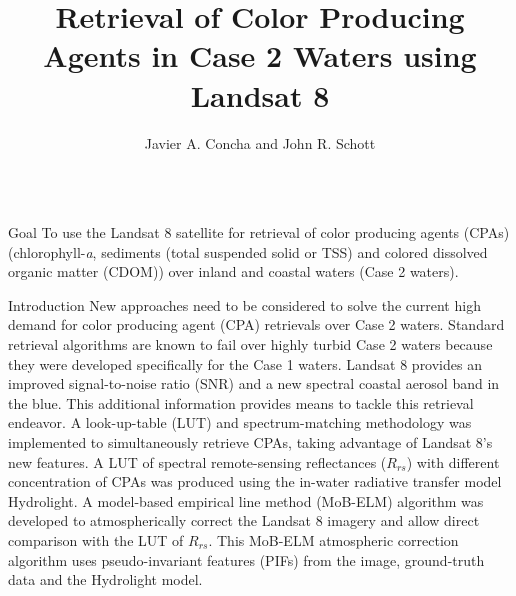 \documentclass{beamer}
\title{ \huge Retrieval of Color Producing Agents in Case 2 Waters using Landsat 8}
\author[]{Javier A. Concha and John R. Schott}
\institute[Rochester Institute of Technology]{Digital Imaging and Remote Sensing Laboratory, Chester F. Carlson Center for Imaging Science\\ Rochester Institute of Technology, Rochester, New York, USA}
\begin{document}
\begin{frame}{} 
  \begin{columns}[t]
    

\begin{column}{.3\linewidth}
\begin{block}{Goal}
\justifying\small 
To use the Landsat 8 satellite for retrieval of color producing agents (CPAs) (chlorophyll-{\it a}, sediments (total suspended solid or TSS) and colored dissolved organic matter (CDOM)) over inland and coastal waters (Case 2 waters). 
\end{block}
\begin{block}{Introduction}
\justifying\small New approaches need to be considered to solve the current high demand for color producing agent (CPA) retrievals over Case 2 waters. Standard retrieval algorithms are known to fail over highly turbid Case 2 waters because they were developed specifically for the Case 1 waters. Landsat 8 provides an improved signal-to-noise ratio (SNR) and a new spectral coastal aerosol band in the blue. This additional information provides means to tackle this retrieval endeavor. A look-up-table (LUT) and spectrum-matching methodology was implemented to simultaneously retrieve CPAs, taking advantage of Landsat 8's new features. A LUT of spectral remote-sensing reflectances ($R_{rs}$) with different concentration of CPAs was produced using the in-water radiative transfer model Hydrolight. A model-based empirical line method (MoB-ELM) algorithm was developed to atmospherically correct the Landsat 8 imagery and allow direct comparison with the LUT of $R_{rs}$. This MoB-ELM atmospheric correction algorithm uses pseudo-invariant features (PIFs) from the image, ground-truth data and the Hydrolight model.


\end{block}
\end{column}
\end{columns}
\end{frame}
\end{document}
